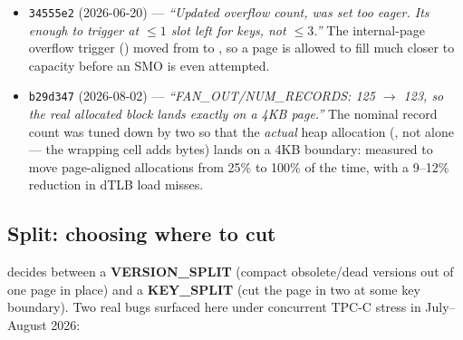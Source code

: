 \documentclass[11pt]{article}
\newcommand{\commit}[1]{\texttt{#1}}
\begin{document}
\begin{itemize}
  \item \commit{34555e2} (2026-06-20) --- \emph{``Updated overflow count, was set too
        eager. Its enough to trigger at $\le 1$ slot left for keys, not $\le 3$.''} The
        internal-page overflow trigger () moved from
         to , so a page is allowed to fill much
        closer to capacity before an SMO is even attempted.
  \item \commit{b29d347} (2026-08-02) --- \emph{``FAN\_OUT/NUM\_RECORDS: 125 $\to$ 123,
        so the real allocated block lands exactly on a 4KB page.''} The nominal record
        count was tuned down by two so that the \emph{actual} heap allocation
        (, not  alone --- the wrapping cell adds
        bytes) lands on a 4KB boundary: measured to move page-aligned allocations from
        25\% to 100\% of the time, with a 9--12\% reduction in dTLB load misses.
\end{itemize}

\subsection{Split: choosing where to cut}

 decides between a \textbf{VERSION\_SPLIT} (compact obsolete/dead versions
out of one page in place) and a \textbf{KEY\_SPLIT} (cut the page in two at some key
boundary). Two real bugs surfaced here under concurrent TPC-C stress in July--August
2026:
\end{document}
